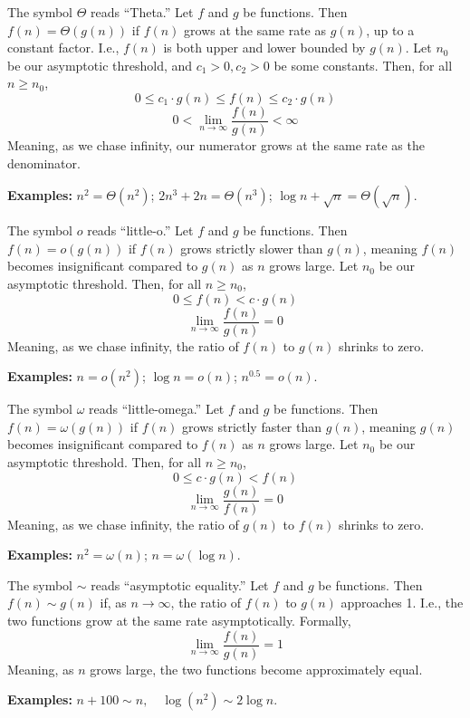 \begin{Def}

    \label{def:bigTheta}
    The symbol $\Theta$ reads ``Theta.'' Let $f$ and $g$ be functions. Then $f(n)=\Theta(g(n))$ if $f(n)$ grows at the same rate as $g(n)$, up to a constant factor. I.e., $f(n)$ is both upper and lower bounded by $g(n)$. Let $n_0$ be our asymptotic threshold, and $c_1>0,c_2>0$ be some constants. Then, for all $n\geq n_0$,
    \large
    \[0\leq c_1\cdot g(n) \leq f(n) \leq c_2\cdot g(n)\]
    \[0<\lim_{n\to\infty}\dfrac{f(n)}{g(n)}<\infty\]
    \normalsize
    \noindent
    Meaning, as we chase infinity, our numerator grows at the same rate as the denominator.
\end{Def}
\noindent
\textbf{Examples:} $n^2=\Theta(n^2)$; $2n^3+2n=\Theta(n^3)$; $\log n+\sqrt{n}=\Theta(\sqrt{n})$.
\begin{Def}

    The symbol $o$ reads ``little-o.'' Let $f$ and $g$ be functions. Then $f(n)=o(g(n))$ if $f(n)$ grows strictly slower than $g(n)$, meaning $f(n)$ becomes insignificant compared to $g(n)$ as $n$ grows large. Let $n_0$ be our asymptotic threshold. Then, for all $n\geq n_0$,
    \large
    \[0\leq f(n) < c \cdot g(n)\]
    \[\lim_{n\to\infty}\dfrac{f(n)}{g(n)}=0\]
    \normalsize
    \noindent
    Meaning, as we chase infinity, the ratio of $f(n)$ to $g(n)$ shrinks to zero.
\end{Def}
\noindent
\textbf{Examples:} $n=\!o(n^2)$; $\log n=\!o(n)$; $n^{0.5}=\!o(n)$.
\begin{Def}

    The symbol $\omega$ reads ``little-omega.'' Let $f$ and $g$ be functions. Then $f(n)=\omega(g(n))$ if $f(n)$ grows strictly faster than $g(n)$, meaning $g(n)$ becomes insignificant compared to $f(n)$ as $n$ grows large. Let $n_0$ be our asymptotic threshold. Then, for all $n\geq n_0$,
    \large
    \[0\leq c \cdot g(n) < f(n)\]
    \[\lim_{n\to\infty}\dfrac{g(n)}{f(n)}=0\]
    \normalsize
    \noindent
    Meaning, as we chase infinity, the ratio of $g(n)$ to $f(n)$ shrinks to zero.
\end{Def}
\noindent
\textbf{Examples:} $n^2=\omega(n)$; $n=\omega(\log n)$.

\newpage 

\begin{Def}

    The symbol \( \sim \) reads ``asymptotic equality.'' Let $f$ and $g$ be functions. Then $f(n) \sim g(n)$ if, as $n \to \infty$, the ratio of $f(n)$ to $g(n)$ approaches 1. I.e., the two functions grow at the same rate asymptotically. Formally,
    \large
    \[\lim_{n\to\infty}\dfrac{f(n)}{g(n)}=1\]
    \normalsize
    \noindent
    Meaning, as $n$ grows large, the two functions become approximately equal.
\end{Def}
\noindent
\textbf{Examples:} $n + 100 \sim n, \quad \log(n^2) \sim 2\log n.$


